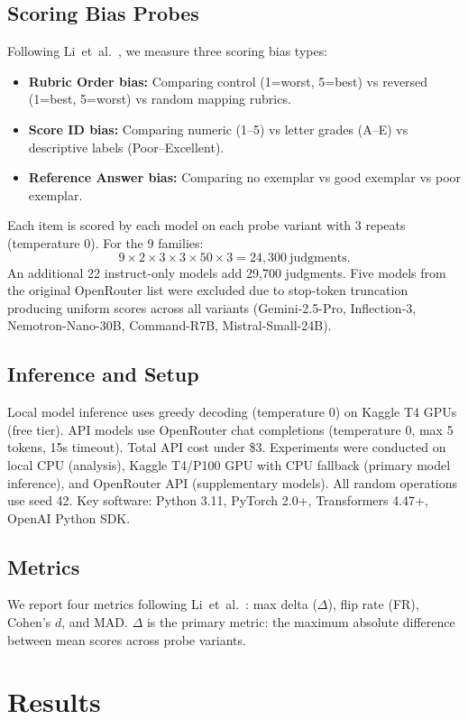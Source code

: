 \documentclass[11pt,twocolumn]{article}
\begin{document}
\subsection{Scoring Bias Probes}
Following Li~et~al.~\cite{li2025scoring}, we measure three scoring bias types:
\begin{itemize}
    \item \textbf{Rubric Order bias:} Comparing control (1=worst, 5=best) vs reversed (1=best, 5=worst) vs random mapping rubrics.
    \item \textbf{Score ID bias:} Comparing numeric (1--5) vs letter grades (A--E) vs descriptive labels (Poor--Excellent).
    \item \textbf{Reference Answer bias:} Comparing no exemplar vs good exemplar vs poor exemplar.
\end{itemize}
Each item is scored by each model on each probe variant with 3 repeats (temperature 0). For the 9 families:
\[
9 \times 2 \times 3 \times 3 \times 50 \times 3 = 24{,}300\ \text{judgments}.
\]
An additional 22 instruct-only models add 29,700 judgments. Five models from the original OpenRouter list were excluded due to stop-token truncation producing uniform scores across all variants (Gemini-2.5-Pro, Inflection-3, Nemotron-Nano-30B, Command-R7B, Mistral-Small-24B).

\subsection{Inference and Setup}
Local model inference uses greedy decoding (temperature 0) on Kaggle T4 GPUs (free tier). API models use OpenRouter chat completions (temperature 0, max 5 tokens, 15s timeout). Total API cost under \$3. Experiments were conducted on local CPU (analysis), Kaggle T4/P100 GPU with CPU fallback (primary model inference), and OpenRouter API (supplementary models). All random operations use seed 42. Key software: Python 3.11, PyTorch 2.0+, Transformers 4.47+, OpenAI Python SDK.

\subsection{Metrics}
We report four metrics following Li~et~al.~\cite{li2025scoring}: max delta ($\Delta$), flip rate (FR), Cohen's $d$, and MAD. $\Delta$ is the primary metric: the maximum absolute difference between mean scores across probe variants.

\section{Results}
\end{document}
